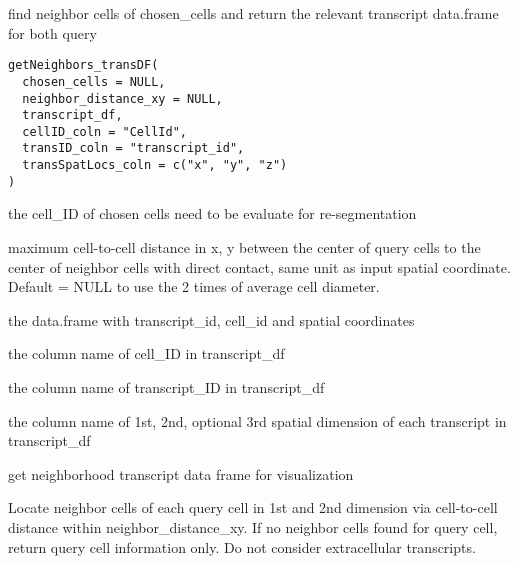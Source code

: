 \documentclass[letterpaper]{book}
\begin{document}
%
\begin{Description}
find neighbor cells of chosen\_cells and return the relevant transcript data.frame for both query
\end{Description}
%
\begin{Usage}
\begin{verbatim}
getNeighbors_transDF(
  chosen_cells = NULL,
  neighbor_distance_xy = NULL,
  transcript_df,
  cellID_coln = "CellId",
  transID_coln = "transcript_id",
  transSpatLocs_coln = c("x", "y", "z")
)
\end{verbatim}
\end{Usage}
%
\begin{Arguments}
\begin{ldescription}
\item[\code{chosen\_cells}] the cell\_ID of chosen cells need to be evaluate for re-segmentation

\item[\code{neighbor\_distance\_xy}] maximum cell-to-cell distance in x, y between the center of query cells to the center of neighbor cells with direct contact, same unit as input spatial coordinate. Default = NULL to use the 2 times of average cell diameter.

\item[\code{transcript\_df}] the data.frame with transcript\_id, cell\_id and spatial coordinates

\item[\code{cellID\_coln}] the column name of cell\_ID in transcript\_df

\item[\code{transID\_coln}] the column name of transcript\_ID in transcript\_df

\item[\code{transSpatLocs\_coln}] the column name of 1st, 2nd, optional 3rd spatial dimension of each transcript in transcript\_df
\end{ldescription}
\end{Arguments}
%
\begin{Details}
get neighborhood transcript data frame for visualization

Locate neighbor cells of each query cell in 1st and 2nd dimension via cell-to-cell distance within neighbor\_distance\_xy. If no neighbor cells found for query cell, return query cell information only. Do not consider extracellular transcripts.
\end{Details}
\end{document}
